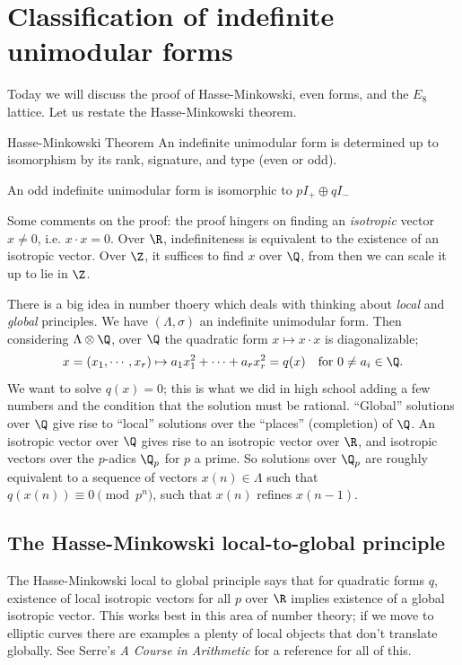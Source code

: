 \section{Classification of indefinite unimodular forms} 
Today we will discuss the proof of Hasse-Minkowski, even forms, and the $E_8$ lattice. Let us restate the Hasse-Minkowski theorem.
\begin{namedthm}{Hasse-Minkowski Theorem} 
    An indefinite unimodular form is determined up to isomorphism by its rank, signature, and type (even or odd). 
\end{namedthm}
\begin{example}
    An odd indefinite unimodular form is isomorphic to $p I_+ \oplus qI_-$
\end{example}
Some comments on the proof: the proof hingers on finding an \emph{isotropic} vector $x\neq 0$, i.e. $x\cdot x=0$. Over $\R$, indefiniteness is equivalent to the existence of an isotropic vector. Over $\Z$, it suffices to find $x$ over $\Q$, from then we can scale it up to lie in $\Z$.

There is a big idea in number thoery which deals with thinking about \emph{local} and \emph{global} principles. We have $(\Lambda, \sigma)$ an indefinite unimodular form. Then considering  $\Lambda \otimes \Q$, over $\Q$ the quadratic form $x \mapsto  x \cdot x$ is diagonalizable; \[
    x=(x_1,\cdots ,x_r) \mapsto  a_1x_1^2+\cdots +a_r x_r^2 =q(x) \quad \text{for } 0\neq a_i  \in  \Q.
\] We want to solve $q(x)=0$; this is what we did in high school adding a few numbers and the condition that the solution must be rational. ``Global'' solutions over $\Q$ give rise to ``local'' solutions over the ``places'' (completion) of $\Q$. An isotropic vector  over $\Q$ gives rise to an isotropic vector over $\R$, and isotropic vectors over the $p$-adics $\Q_p$ for $p$ a prime. So solutions over $\Q_p$ are roughly equivalent to a sequence of vectors $x(n) \in  \Lambda$ such that $q(x(n))\equiv 0 \pmod {p^n} $, such that $x(n)$ refines $x(n-1)$.

\subsection{The Hasse-Minkowski local-to-global principle}

The Hasse-Minkowski local to global principle says that for quadratic forms $q$, existence of local isotropic vectors for all $p$ over $\R$ implies existence of a global isotropic vector. This works best in this area of number theory; if we move to elliptic curves there are examples a plenty of local objects that don't translate globally. See Serre's \emph{A Course in Arithmetic} for a reference for all of this.

